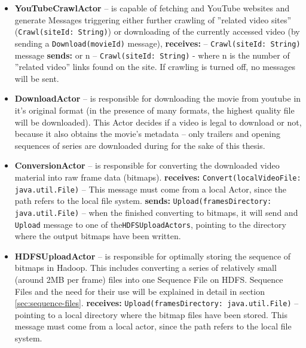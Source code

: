 \begin{itemize}
  \item \textbf{YouTubeCrawlActor} -- is capable of fetching and YouTube websites and generate Messages triggering
                                    either further crawling of ''related video sites'' (\verb|Crawl(siteId: String)|) or downloading of the 
                                    currently accessed video (by sending a \verb|Download(movieId)| message),
    \subitem  \textbf{receives:}
       -- \verb|Crawl(siteId: String)| message
    \subitem  \textbf{sends:}
       or n -- \verb|Crawl(siteId: String)| - where n is the number of ''related video'' links found on the site. 
                                                           If crawling is turned off, no messages will be sent.

  \item \textbf{DownloadActor} -- is responsible for downloading the movie from youtube in it's original format (in the presence of many formats, 
                                the highest quality file will be downloaded). This Actor decides if a video is legal to download or not, because it also
                                obtains the movie's metadata -- only trailers and opening sequences of series are downloaded during for the sake of this 
                                thesis.
                                
  \item \textbf{ConversionActor} -- is responsible for converting the downloaded video material into raw frame data (bitmaps).
    \subitem  \textbf{receives:}
      \subsubitem \verb|Convert(localVideoFile: java.util.File)| -- This message must come from a local Actor, since the path refers to the local file system.
    \subitem  \textbf{sends:}
      \subsubitem \verb|Upload(framesDirectory: java.util.File)| -- when the finished converting to bitmaps, it will send and \verb|Upload| 
                                                                    message to one of the\verb|HDFSUploadActors|, pointing to the directory where the 
                                                                    output bitmaps have been written.
                                                                    
  \item \textbf{HDFSUploadActor} -- is responsible for optimally storing the sequence of bitmaps in Hadoop. This includes converting a series of 
                                  relatively small (around 2MB per frame) files into one Sequence File on HDFS. Sequence Files and the need for their use
                                  will be explained in detail in section \ref{sec:sequence-files}.
  \subitem \textbf{receives:}
    \subsubitem \verb|Upload(framesDirectory: java.util.File)| -- pointing to a local directory where the bitmap files have been stored.
                                                                 This message must come from a local actor, since the path refers to the local file system.
\end{itemize}

